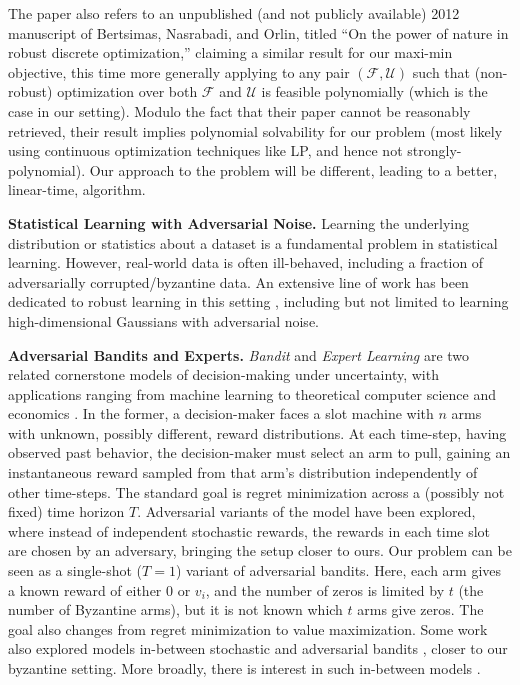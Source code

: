 \documentclass[sigconf,nonacm]{aamas}
\begin{document}
The paper \cite{selection_minmax_regret_randomized} also refers to an unpublished (and not publicly available) 2012 manuscript of Bertsimas, Nasrabadi, and Orlin, titled ``On the power of nature in robust discrete optimization,'' claiming a similar result for our maxi-min objective, this time more generally applying to any pair $(\mathcal{F}, \mathcal{U})$ such that (non-robust) optimization over both $\mathcal{F}$ and $\mathcal{U}$ is feasible polynomially (which is the case in our setting). Modulo the fact that their paper cannot be reasonably retrieved, their result implies polynomial solvability for our problem (most likely using continuous optimization techniques like LP, and hence not strongly-polynomial). Our approach to the problem will be different, leading to a better, linear-time, algorithm.

\noindent \textbf{Statistical Learning with Adversarial Noise.} Learning the underlying distribution or statistics about a dataset is a fundamental problem in statistical learning. However, real-world data is often ill-behaved, including a fraction of adversarially corrupted/byzantine data. An extensive line of work has been dedicated to robust learning in this setting \cite{robust_mean_covariance_1, robust_geometric_concept_classes, robust_gaussians_1, robust_gaussians_2, learning_from_untrusted_data}, including but not limited to learning high-dimensional Gaussians with adversarial noise.

\noindent \textbf{Adversarial Bandits and Experts.} \emph{Bandit} and \emph{Expert Learning} are two related cornerstone models of decision-making under uncertainty, with applications ranging from machine learning to theoretical computer science and economics \cite{bandits1, bandits2, bandits3}. In the former, a decision-maker faces a slot machine with $n$ arms with unknown, possibly different, reward distributions. At each time-step, having observed past behavior, the decision-maker must select an arm to pull, gaining an instantaneous reward sampled from that arm's distribution independently of other time-steps.
The standard goal is regret minimization across a (possibly not fixed) time horizon $T$. Adversarial variants of the model have been explored, where instead of independent stochastic rewards, the rewards in each time slot are chosen by an adversary, bringing the setup closer to ours. Our problem can be seen as a single-shot ($T = 1$) variant of adversarial bandits. Here, each arm gives a known reward of either $0$ or $v_i$, and the number of zeros is limited by $t$ (the number of Byzantine arms), but it is not known which $t$ arms give zeros. The goal also changes from regret minimization to value maximization. Some work also explored models in-between stochastic and adversarial bandits \cite{stochastic_adversarial_bandits,stochastic_adversarial_bandits_2}, closer to our byzantine setting.
More broadly, there is interest in such in-between models \cite{stochastic_adversarial}.
\end{document}
